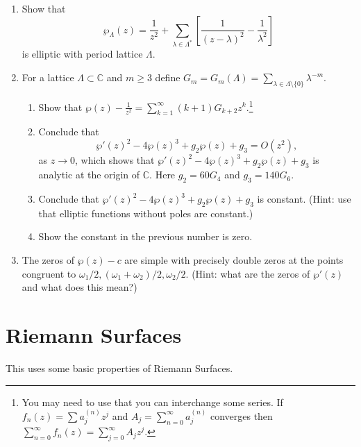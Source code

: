 \documentclass[a4paper,10pt]{article}
\newcommand{\CC}{\mathbb{C}}
\begin{document}
\begin{enumerate}
\item Show that 
$$ \wp_{\Lambda}(z) = \frac{1}{z^2} + \sum_{\lambda \in \Lambda^*} \left[ \frac{1}{(z-\lambda)^2} - \frac{1}{\lambda^2} \right] $$
is elliptic with period lattice $\Lambda$.

\item For a lattice $\Lambda \subset \CC$ and $m\geq 3$ define $G_m = G_m(\Lambda) =  \sum_{\lambda \in \Lambda\setminus \lbrace 0 \rbrace } \lambda^{-m}. $   
\begin{enumerate}
	\item Show that $ \wp(z) - \frac{1}{z^2} = \sum_{k=1}^{\infty} (k+1)G_{k+2} z^k.$\footnote{You may need to use that you can interchange some series. If $f_n(z) = \sum a_j^{(n)} z^j$ and $A_j = \sum_{n=0}^{\infty} a_j^{(n)} $ converges then $\sum_{n=0}^{\infty} f_n(z) = \sum_{j=0}^{\infty} A_j z^j$. } 
	\item Conclude that 
	$$ \wp'(z)^2 - 4 \wp(z)^3 + g_2 \wp(z) + g_3 = O(z^2),$$
	as $z \to 0$, which shows that $\wp'(z)^2 - 4 \wp(z)^3 + g_2 \wp(z) + g_3$ is analytic at the origin of $\CC$. 
	Here $g_2 = 60 G_4$ and $g_3 = 140 G_6$.
	\item Conclude that $\wp'(z)^2 - 4 \wp(z)^3 + g_2 \wp(z) + g_3$ is constant. (Hint: use that elliptic functions without poles are constant.)
	\item Show the constant in the previous number is zero.
\end{enumerate}

\item The zeros of $\wp(z)-c$ are simple with precisely double zeros at the points congruent to $\omega_1/2, (\omega_1+\omega_2)/2, \omega_2/2$. (Hint: what are the zeros of $\wp'(z)$ and what does this mean?)

\end{enumerate}



\section{Riemann Surfaces}
This uses some basic properties of Riemann Surfaces.
\end{document}
